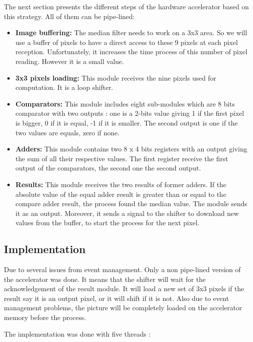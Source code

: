 \documentclass[journal]{IEEEtran}
\begin{document}
The next section presents the different steps of the hardware accelerator based on this strategy. All of them can be pipe-lined:

\begin{itemize}
\item \textbf{Image buffering:} The median filter needs to work on a 3x3 area. So we will use a buffer of pixels to have a direct access to these 9 pixels at each pixel reception. Unfortunately, it increases the time process of this number of pixel reading. However it is a small value.
\item \textbf{3x3 pixels loading:} This module receives the nine pixels used for computation. It is a loop shifter.
\item \textbf{Comparators:} This module includes eight sub-modules which are 8 bits comparator with two outputs : one is a 2-bits value giving 1 if the first pixel is bigger, 0 if it is equal, -1 if it is smaller. The second output is one if the two values are equals, zero if none.
\item \textbf{Adders:} This module contains two 8 x 4 bits registers with an output giving the sum of all their respective values. The first register receive the first output of the comparators, the second one the second output.
\item \textbf{Results:} This module receives the two results of former adders. If the absolute value of the equal adder result is greater than or equal to the compare adder result, the process found the median value. The module sends it as an output. Moreover, it sends a signal to the shifter to download new values from the buffer, to start the process for the next pixel.
\end{itemize}

\subsection{Implementation}
Due to several issues from event management. Only a non pipe-lined version of the accelerator was done. It means that the shifter will wait for the acknowledgement of the result module. It will load a new set of 3x3 pixels if the result say it is an output pixel, or it will shift if it is not. Also due to event management problems, the picture will be completely loaded on the accelerator memory before the process.

The implementation was done with five threads :
\end{document}
